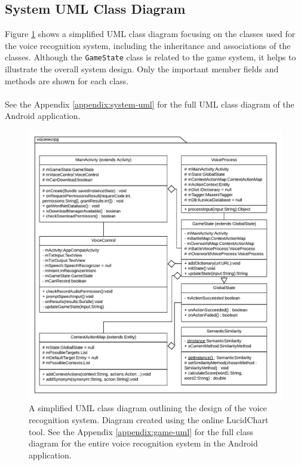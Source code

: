 \documentclass[11pt]{article}
\begin{document}
\subsection{System UML Class Diagram}

Figure \ref{fig:system-overview} shows a simplified UML class diagram focusing on the classes used for the voice recognition system, including the inheritance and associations of the classes. Although the \texttt{GameState} class is related to the game system, it helps to illustrate the overall system design. Only the important member fields and methods are shown for each class.
\\
\\
See the Appendix \ref{appendix:system-uml} for the full UML class diagram of the Android application.

\begin{center}
\begin{figure}[H]
\begin{center}
  \includegraphics[width=\linewidth]{system-overview.pdf}
  \caption{A simplified UML class diagram outlining the design of the voice recognition system. Diagram created using the online LucidChart tool. See the Appendix \ref{appendix:game-uml} for the full class diagram for the entire voice recognition system in the Android application.}
  \label{fig:system-overview}
  \end{center}
\end{figure}
\end{center}
\end{document}
